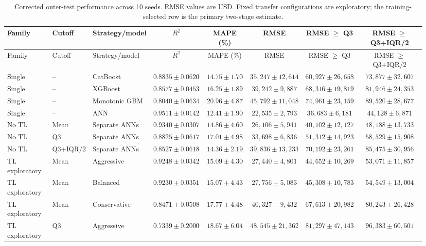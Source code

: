 \documentclass[10pt]{article}
\begin{document}
\setcounter{table}{3}
\begin{landscape}
\scriptsize
\begin{longtable}{lllccccc}
\caption{Corrected outer-test performance across 10 seeds. RMSE values are USD. Fixed transfer configurations are exploratory; the training-selected row is the primary two-stage estimate.}\\
\toprule
Family & Cutoff & Strategy/model & $R^2$ & MAPE (\%) & RMSE & RMSE $\geq$ Q3 & RMSE $\geq$ Q3+IQR/2 \\
\midrule
\endfirsthead
\toprule
Family & Cutoff & Strategy/model & $R^2$ & MAPE (\%) & RMSE & RMSE $\geq$ Q3 & RMSE $\geq$ Q3+IQR/2 \\
\midrule
\endhead
Single & -- & CatBoost & $0.8835\pm0.0620$ & $14.75\pm1.70$ & $35{,}247\pm12{,}614$ & $60{,}927\pm26{,}658$ & $73{,}877\pm32{,}607$ \\
Single & -- & XGBoost & $0.8577\pm0.0453$ & $16.25\pm1.89$ & $39{,}242\pm9{,}887$ & $68{,}316\pm19{,}819$ & $81{,}946\pm24{,}353$ \\
Single & -- & Monotonic GBM & $0.8040\pm0.0634$ & $20.96\pm4.87$ & $45{,}792\pm11{,}048$ & $74{,}961\pm23{,}159$ & $89{,}520\pm28{,}677$ \\
\rowcolor{lightblue}Single & -- & ANN & $0.9511\pm0.0142$ & $12.41\pm1.90$ & $22{,}535\pm2{,}793$ & $36{,}683\pm6{,}181$ & $44{,}128\pm6{,}871$ \\
\midrule
No TL & Mean & Separate ANNs & $0.9340\pm0.0307$ & $14.86\pm4.60$ & $26{,}106\pm5{,}941$ & $40{,}102\pm12{,}127$ & $48{,}188\pm13{,}733$ \\
No TL & Q3 & Separate ANNs & $0.8825\pm0.0617$ & $17.01\pm4.98$ & $33{,}698\pm6{,}836$ & $51{,}312\pm14{,}923$ & $58{,}529\pm15{,}908$ \\
No TL & Q3+IQR/2 & Separate ANNs & $0.8527\pm0.0618$ & $14.36\pm2.19$ & $39{,}836\pm13{,}233$ & $70{,}192\pm23{,}261$ & $85{,}475\pm30{,}956$ \\
\midrule
TL exploratory & Mean & Aggressive & $0.9248\pm0.0342$ & $15.09\pm4.30$ & $27{,}440\pm4{,}801$ & $44{,}652\pm10{,}269$ & $53{,}071\pm11{,}857$ \\
TL exploratory & Mean & Balanced & $0.9230\pm0.0351$ & $15.07\pm4.43$ & $27{,}756\pm5{,}083$ & $45{,}308\pm10{,}783$ & $54{,}549\pm13{,}004$ \\
TL exploratory & Mean & Conservative & $0.8471\pm0.0508$ & $17.77\pm4.48$ & $40{,}327\pm9{,}432$ & $67{,}613\pm20{,}982$ & $80{,}243\pm26{,}428$ \\
TL exploratory & Q3 & Aggressive & $0.7339\pm0.2000$ & $18.67\pm6.04$ & $48{,}545\pm21{,}362$ & $81{,}297\pm47{,}143$ & $96{,}383\pm60{,}501$ \\

\end{longtable}
\end{landscape}
\end{document}
